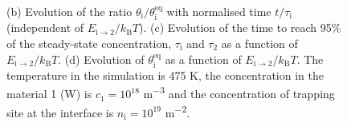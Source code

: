 \begin{figure} [h!]
{    (b) Evolution of the ratio $\theta_\mathrm{i}/\theta_\mathrm{i}^\mathrm{eq}$ with normalised time $t/\tau_\mathrm{i}$ (independent of $E_\mathrm{i\rightarrow2}/k_\mathrm{B}T$).
    (c) Evolution of the time to reach 95\% of the steady-state concentration, $\tau_\mathrm{i}$ and $\tau_\mathrm{2}$ as a function of $E_\mathrm{i \rightarrow 2}/k_\mathrm{B}T$.
    (d) Evolution of $\theta_\mathrm{i}^\mathrm{eq}$ as a function of $E_\mathrm{i\rightarrow2}/k_\mathrm{B}T$.
    The temperature in the simulation is 475 K, the concentration in the material 1 (W) is $c_1=10^{18}$ \si{m^{-3}} and the concentration of trapping site at the interface is $n_\mathrm{i}=10^{19}$ \si{m^{-2}}.}
\end{figure}

